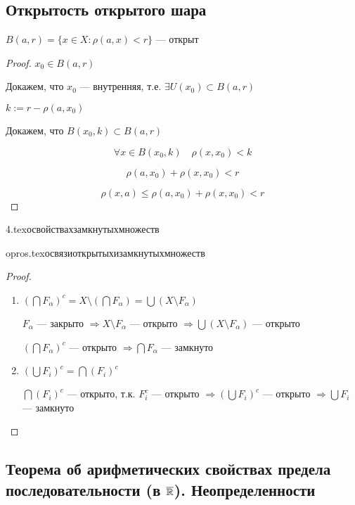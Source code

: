 \subsection{Открытость открытого шара}
$B(a,r)=\{x\in X : \rho(a,x)<r\}$ --- открыт
\begin{proof}
    $x_0\in B(a, r)$

    Докажем, что $x_0$ --- внутренняя, т.е. $\exists U(x_0)\subset B(a, r)$

    $k:=r-\rho(a, x_0)$

    Докажем, что $B(x_0, k)\subset B(a, r)$

    $$\forall x\in B(x_0, k) \quad \rho(x, x_0)<k$$
    
    $$\rho(a, x_0) + \rho(x, x_0)<r$$

    $$\rho(x, a) \leq \rho(a, x_0) + \rho(x, x_0)<r$$
\end{proof}

{4.tex}{освойствахзамкнутыхмножеств}

{opros.tex}{освязиоткрытыхизамкнутыхмножеств}
\begin{proof}
    \begin{enumerate}
        \item $(\bigcap F_\alpha)^c=X\setminus(\bigcap F_\alpha)=\bigcup (X\setminus F_\alpha)$
        
        $F_\alpha$ --- закрыто $\Rightarrow X\setminus F_\alpha$ --- открыто $\Rightarrow \bigcup (X\setminus F_\alpha)$ --- открыто

        $(\bigcap F_\alpha)^c$ --- открыто $\Rightarrow \bigcap F_\alpha$ --- замкнуто

        \item $(\bigcup F_i)^c=\bigcap(F_i)^c$
        
        $\bigcap(F_i)^c$ --- открыто, т.к. $F_i^c$ --- открыто $\Rightarrow (\bigcup F_i)^c$ --- открыто $\Rightarrow \bigcup F_i$ --- замкнуто
    \end{enumerate}
\end{proof}

\subsection{\teormin Теорема об арифметических свойствах предела последовательности (в $\overline{\mathbb{R}}$). Неопределенности}
